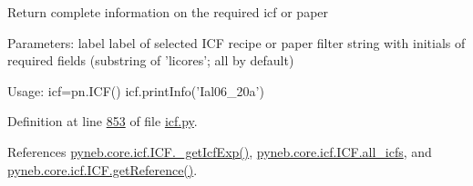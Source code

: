 \begin{DoxyVerb}Return complete information on the required icf or paper

Parameters:
    label    label of selected ICF recipe or paper
    filter   string with initials of required fields (substring of 'licores'; all by default)   
    
Usage:
icf=pn.ICF()
icf.printInfo('Ial06_20a')\end{DoxyVerb}
 

Definition at line \hyperlink{icf_8py_source_l00853}{853} of file \hyperlink{icf_8py_source}{icf.\-py}.



References \hyperlink{icf_8py_source_l00738}{pyneb.\-core.\-icf.\-I\-C\-F.\-\_\-get\-Icf\-Exp()}, \hyperlink{icf_8py_source_l00023}{pyneb.\-core.\-icf.\-I\-C\-F.\-all\-\_\-icfs}, and \hyperlink{icf_8py_source_l00878}{pyneb.\-core.\-icf.\-I\-C\-F.\-get\-Reference()}.


